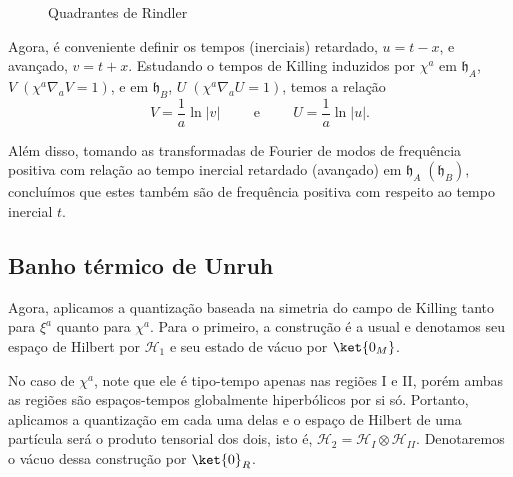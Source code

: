 \documentclass[12pt]{article}
\newcommand{\h}{\mathcal{H}}
\begin{document}
\begin{figure}[ht]
    \centering
    \caption{Quadrantes de Rindler}
    \label{fig:wedges}
\end{figure}

Agora, é conveniente definir os tempos (inerciais) retardado, \(u=t-x\), e avançado, \(v=t+x\). Estudando o tempos de Killing induzidos por \(\chi^a\) em \(\mathfrak{h}_A\), \(V\;(\chi^a\nabla_aV=1)\), e em \(\mathfrak{h}_B\), \(U\;(\chi^a\nabla_aU=1)\), temos a relação
\begin{equation}
    V=\frac{1}{a}\ln{\lvert v\rvert}\hspace{1cm}\text{e}\hspace{1cm}U=\frac{1}{a}\ln{\lvert u\rvert}.
\end{equation}

Além disso, tomando as transformadas de Fourier de modos de frequência positiva com relação ao tempo inercial retardado (avançado) em \(\mathfrak{h}_A\;(\mathfrak{h}_B)\), concluímos que estes também são de frequência positiva com respeito ao tempo inercial \(t\).

\subsection*{Banho térmico de Unruh}
Agora, aplicamos a quantização baseada na simetria do campo de Killing tanto para \(\xi^a\) quanto para \(\chi^a\). Para o primeiro, a construção é a usual e denotamos seu espaço de Hilbert por \(\h_1\) e seu estado de vácuo por \(\ket{0_M}\). 

No caso de \(\chi^a\), note que ele é tipo-tempo apenas nas regiões I e II, porém ambas as regiões são espaços-tempos globalmente hiperbólicos por si só. Portanto, aplicamos a quantização em cada uma delas e o espaço de Hilbert de uma partícula será o produto tensorial dos dois, isto é, \(\h_2=\h_I\otimes\h_{II}\). Denotaremos o vácuo dessa construção por \(\ket{0}_R\).
\end{document}

